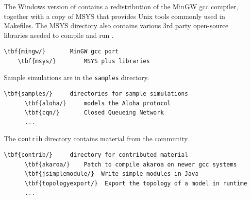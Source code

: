 The Windows version of {\opp} contains a redistribution of the MinGW
gcc compiler, together with a copy of MSYS that provides Unix tools
commonly used in Makefiles. The MSYS directory also contains various
3rd party open-source libraries needed to compile and run {\opp}.

\begin{Verbatim}[commandchars=\\\{\}]
    \tbf{mingw/}       MinGW gcc port
    \tbf{msys/}        MSYS plus libraries
\end{Verbatim}

Sample simulations are in the \texttt{samples} directory.

\begin{Verbatim}[commandchars=\\\{\}]
    \tbf{samples/}     directories for sample simulations
      \tbf{aloha/}     models the Aloha protocol
      \tbf{cqn/}       Closed Queueing Network
      ...
\end{Verbatim}

The \texttt{contrib} directory contains material from the {\opp} community.

\begin{Verbatim}[commandchars=\\\{\}]
    \tbf{contrib/}     directory for contributed material
      \tbf{akaroa/}    Patch to compile akaroa on newer gcc systems
      \tbf{jsimplemodule/}  Write simple modules in Java
      \tbf{topologyexport/}  Export the topology of a model in runtime
      ...
\end{Verbatim}



